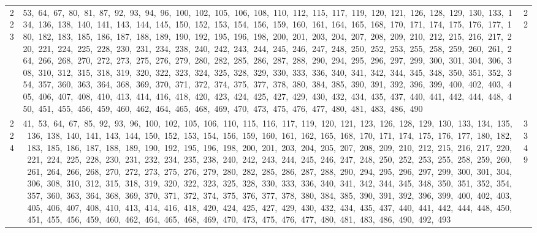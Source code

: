 \begin{longtable}{c|p{}|r}
223 & 53,\ 64,\ 67,\ 80,\ 81,\ 87,\ 92,\ 93,\ 94,\ 96,\ 100,\ 102,\ 105,\ 106,\ 108,\ 110,\ 112,\ 115,\ 117,\ 119,\ 120,\ 121,\ 126,\ 128,\ 129,\ 130,\ 133,\ 134,\ 136,\ 138,\ 140,\ 141,\ 143,\ 144,\ 145,\ 150,\ 152,\ 153,\ 154,\ 156,\ 159,\ 160,\ 161,\ 164,\ 165,\ 168,\ 170,\ 171,\ 174,\ 175,\ 176,\ 177,\ 180,\ 182,\ 183,\ 185,\ 186,\ 187,\ 188,\ 189,\ 190,\ 192,\ 195,\ 196,\ 198,\ 200,\ 201,\ 203,\ 204,\ 207,\ 208,\ 209,\ 210,\ 212,\ 215,\ 216,\ 217,\ 220,\ 221,\ 224,\ 225,\ 228,\ 230,\ 231,\ 234,\ 238,\ 240,\ 242,\ 243,\ 244,\ 245,\ 246,\ 247,\ 248,\ 250,\ 252,\ 253,\ 255,\ 258,\ 259,\ 260,\ 261,\ 264,\ 266,\ 268,\ 270,\ 272,\ 273,\ 275,\ 276,\ 279,\ 280,\ 282,\ 285,\ 286,\ 287,\ 288,\ 290,\ 294,\ 295,\ 296,\ 297,\ 299,\ 300,\ 301,\ 304,\ 306,\ 308,\ 310,\ 312,\ 315,\ 318,\ 319,\ 320,\ 322,\ 323,\ 324,\ 325,\ 328,\ 329,\ 330,\ 333,\ 336,\ 340,\ 341,\ 342,\ 344,\ 345,\ 348,\ 350,\ 351,\ 352,\ 354,\ 357,\ 360,\ 363,\ 364,\ 368,\ 369,\ 370,\ 371,\ 372,\ 374,\ 375,\ 377,\ 378,\ 380,\ 384,\ 385,\ 390,\ 391,\ 392,\ 396,\ 399,\ 400,\ 402,\ 403,\ 405,\ 406,\ 407,\ 408,\ 410,\ 413,\ 414,\ 416,\ 418,\ 420,\ 423,\ 424,\ 425,\ 427,\ 429,\ 430,\ 432,\ 434,\ 435,\ 437,\ 440,\ 441,\ 442,\ 444,\ 448,\ 450,\ 451,\ 455,\ 456,\ 459,\ 460,\ 462,\ 464,\ 465,\ 468,\ 469,\ 470,\ 473,\ 475,\ 476,\ 477,\ 480,\ 481,\ 483,\ 486,\ 490 & 22 \\
224 & 41,\ 53,\ 64,\ 67,\ 85,\ 92,\ 93,\ 96,\ 100,\ 102,\ 105,\ 106,\ 110,\ 115,\ 116,\ 117,\ 119,\ 120,\ 121,\ 123,\ 126,\ 128,\ 129,\ 130,\ 133,\ 134,\ 135,\ 136,\ 138,\ 140,\ 141,\ 143,\ 144,\ 150,\ 152,\ 153,\ 154,\ 156,\ 159,\ 160,\ 161,\ 162,\ 165,\ 168,\ 170,\ 171,\ 174,\ 175,\ 176,\ 177,\ 180,\ 182,\ 183,\ 185,\ 186,\ 187,\ 188,\ 189,\ 190,\ 192,\ 195,\ 196,\ 198,\ 200,\ 201,\ 203,\ 204,\ 205,\ 207,\ 208,\ 209,\ 210,\ 212,\ 215,\ 216,\ 217,\ 220,\ 221,\ 224,\ 225,\ 228,\ 230,\ 231,\ 232,\ 234,\ 235,\ 238,\ 240,\ 242,\ 243,\ 244,\ 245,\ 246,\ 247,\ 248,\ 250,\ 252,\ 253,\ 255,\ 258,\ 259,\ 260,\ 261,\ 264,\ 266,\ 268,\ 270,\ 272,\ 273,\ 275,\ 276,\ 279,\ 280,\ 282,\ 285,\ 286,\ 287,\ 288,\ 290,\ 294,\ 295,\ 296,\ 297,\ 299,\ 300,\ 301,\ 304,\ 306,\ 308,\ 310,\ 312,\ 315,\ 318,\ 319,\ 320,\ 322,\ 323,\ 325,\ 328,\ 330,\ 333,\ 336,\ 340,\ 341,\ 342,\ 344,\ 345,\ 348,\ 350,\ 351,\ 352,\ 354,\ 357,\ 360,\ 363,\ 364,\ 368,\ 369,\ 370,\ 371,\ 372,\ 374,\ 375,\ 376,\ 377,\ 378,\ 380,\ 384,\ 385,\ 390,\ 391,\ 392,\ 396,\ 399,\ 400,\ 402,\ 403,\ 405,\ 406,\ 407,\ 408,\ 410,\ 413,\ 414,\ 416,\ 418,\ 420,\ 424,\ 425,\ 427,\ 429,\ 430,\ 432,\ 434,\ 435,\ 437,\ 440,\ 441,\ 442,\ 444,\ 448,\ 450,\ 451,\ 455,\ 456,\ 459,\ 460,\ 462,\ 464,\ 465,\ 468,\ 469,\ 470,\ 473,\ 475,\ 476,\ 477,\ 480,\ 481,\ 483,\ 486,\ 490,\ 492,\ 493 & 3349 \\

\end{longtable}
